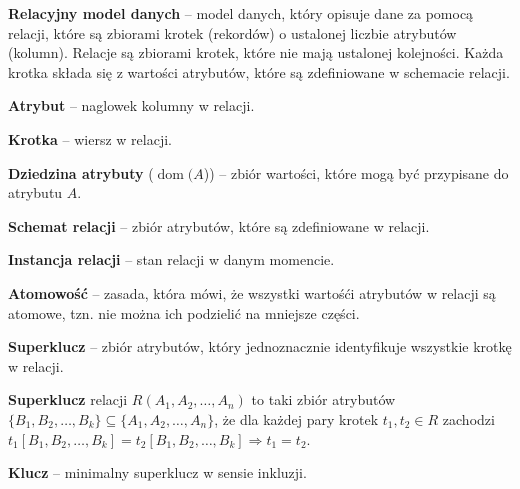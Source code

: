 
\begin{definition}
    \textbf{Relacyjny model danych} -- model danych, który opisuje dane za pomocą relacji, które są zbiorami krotek (rekordów) o ustalonej liczbie atrybutów (kolumn). Relacje są zbiorami krotek, które nie mają ustalonej kolejności. Każda krotka składa się z wartości atrybutów, które są zdefiniowane w schemacie relacji.
\end{definition}

\begin{definition}
    \textbf{Atrybut} -- naglowek kolumny w relacji.
\end{definition}

\begin{definition}
    \textbf{Krotka} -- wiersz w relacji.
\end{definition}

\begin{definition}
    \textbf{Dziedzina atrybuty} (\( \operatorname{dom}( A\))) -- zbiór wartości, które mogą być przypisane do atrybutu \(A\).
\end{definition}

\begin{definition}
    \textbf{Schemat relacji} -- zbiór atrybutów, które są zdefiniowane w relacji.
\end{definition}

\begin{definition}
    \textbf{Instancja relacji} -- stan relacji w danym momencie.
\end{definition}

\begin{definition}
    \textbf{Atomowość} -- zasada, która mówi, że wszystki wartośći atrybutów w relacji są atomowe, tzn. nie można ich podzielić na mniejsze części.
\end{definition}

\begin{definition}
    \textbf{Superklucz} -- zbiór atrybutów, który jednoznacznie identyfikuje wszystkie krotkę w relacji.
\end{definition}

\textbf{Superklucz} relacji \(R(A_1, A_2, \ldots, A_n)\) to taki zbiór atrybutów \(\{B_1, B_2, \ldots, B_k \} \subseteq \{ A_1, A_2, \ldots, A_n \} \), że dla każdej pary krotek \(t_1, t_2 \in R\) zachodzi 
\(t_1[B_1, B_2, \ldots, B_k] = t_2[B_1, B_2, \ldots, B_k] \Rightarrow t_1 = t_2 \).

\begin{definition}
    \textbf{Klucz} -- minimalny superklucz w sensie inkluzji.
\end{definition}

